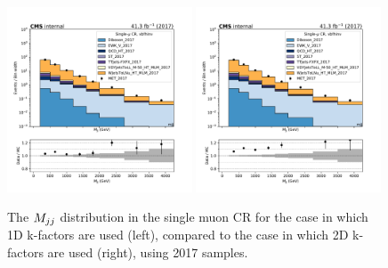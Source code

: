 \begin{figure}
    \begin{center}
        \includegraphics[width=0.49\textwidth]{fig/datamc/cr_1m_vbf/cr_1m_vbf_mjj_losf_2017.pdf}
        \includegraphics[width=0.49\textwidth]{fig/datamc_2dkfac/cr_1m_vbf/cr_1m_vbf_mjj_losf_2017.pdf} 
        \caption{The $M_{jj}$ distribution in the single muon CR for the case in which 1D k-factors are used (left), 
        compared to the case in which 2D k-factors are used (right), using 2017 samples.}
        \label{fig:mjj_2017}
    \end{center}
\end{figure}


